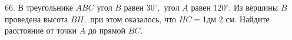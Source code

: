 66. В треугольнике $ABC$ угол $B$ равен $30^\circ,$ угол $A$ равен $120^\circ.$ Из вершины $B$ проведена высота $BH,$ при этом оказалось, что $HC=$1дм 2 см. Найдите расстояние от точки $A$ до прямой $BC.$\\
